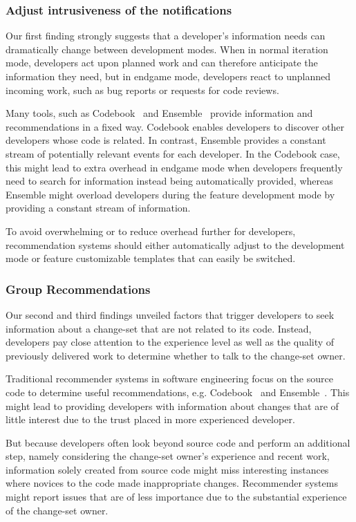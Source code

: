 \subsubsection{Adjust intrusiveness of the notifications}
Our first finding strongly suggests that a developer's information needs can dramatically change between development modes. 
%
When in normal iteration mode, developers act upon planned work and can therefore anticipate the information they need, but in endgame mode, developers react to unplanned incoming work, such as bug reports or requests for code reviews. 

Many tools, such as Codebook~\cite{begel:icse:2010} and Ensemble~\cite{xiang:rsse:2008} provide information and recommendations in a fixed way. 
Codebook enables developers to discover other developers whose code is related.
In contrast,  Ensemble provides a constant stream of potentially relevant events for each developer.
In the Codebook case, this might lead to extra overhead in endgame mode when developers frequently need to search for information instead being automatically provided, whereas Ensemble might overload developers during the feature development mode by providing a constant stream of information.

To avoid overwhelming or to reduce overhead further for developers, recommendation systems should either automatically adjust to the development mode or feature customizable templates that can easily be switched. 

\subsubsection{Group Recommendations}
Our second and third findings unveiled factors that trigger developers to seek information about a change-set that are not related to its code. 
Instead, developers pay close attention to the experience level as well as the quality of previously delivered work to determine whether to talk to the change-set owner.

Traditional recommender systems in software engineering focus on the source code to determine useful recommendations, e.g. Codebook~\cite{begel:icse:2010} and Ensemble~\cite{xiang:rsse:2008}.
This might lead to providing developers with information about changes that are of little interest due to the trust placed in more experienced developer. 

But because developers often look beyond source code and perform an additional step, namely considering the change-set owner's experience and recent work, information solely created from source code might miss interesting instances where novices to the code made inappropriate changes.
Recommender systems might report issues that are of less importance due to the substantial experience of the change-set owner.

